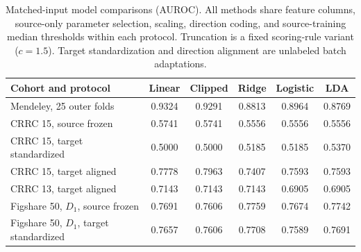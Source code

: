 \begin{table}[t]
\centering\footnotesize\vspace{-3pt}
\caption{Matched-input model comparisons (AUROC). All methods share feature columns, source-only parameter selection, scaling, direction coding, and source-training median thresholds within each protocol. Truncation is a fixed scoring-rule variant ($c=1.5$). Target standardization and direction alignment are unlabeled batch adaptations.}
\label{tab:matched_comparison}
\renewcommand{\arraystretch}{0.92}
\begin{tabular*}{\textwidth}{@{\extracolsep{\fill}}lccccc}
\hline
\textbf{Cohort and protocol} & \textbf{Linear} & \textbf{Clipped} & \textbf{Ridge} & \textbf{Logistic} & \textbf{LDA} \\
\hline
Mendeley, 25 outer folds & 0.9324 & 0.9291 & 0.8813 & 0.8964 & 0.8769 \\
CRRC 15, source frozen & 0.5741 & 0.5741 & 0.5556 & 0.5556 & 0.5556 \\
CRRC 15, target standardized & 0.5000 & 0.5000 & 0.5185 & 0.5185 & 0.5370 \\
CRRC 15, target aligned & 0.7778 & 0.7963 & 0.7407 & 0.7593 & 0.7593 \\
CRRC 13, target aligned & 0.7143 & 0.7143 & 0.7143 & 0.6905 & 0.6905 \\
Figshare 50, $D_1$, source frozen & 0.7691 & 0.7606 & 0.7759 & 0.7674 & 0.7742 \\
Figshare 50, $D_1$, target standardized & 0.7657 & 0.7606 & 0.7708 & 0.7589 & 0.7691 \\
\hline
\end{tabular*}
\end{table}
